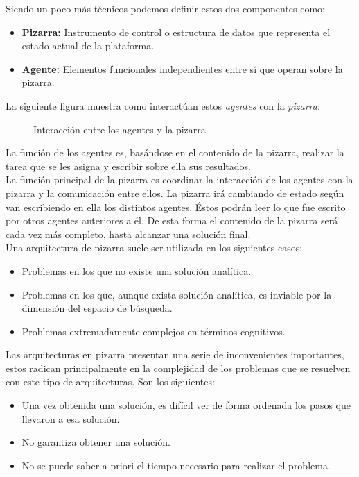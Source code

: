 Siendo un poco más técnicos podemos definir estos dos componentes como:

\begin{itemize}
	\item \textbf{Pizarra: }Instrumento de control o estructura de datos que representa el estado actual de la plataforma.
	\item \textbf{Agente: }Elementos funcionales independientes entre sí que operan sobre la pizarra.
\end{itemize}

La siguiente figura muestra como interactúan estos \emph{agentes} con la \emph{pizarra}:

\begin{figure}[!h]
\centering
{}
\caption{Interacción entre los agentes y la pizarra}
\end{figure}
 
La función de los agentes es, basándose en el contenido de la pizarra, realizar la tarea que se les asigna y escribir sobre ella sus resultados.\\

La función principal de la pizarra es coordinar la interacción de los agentes con la pizarra y la comunicación entre ellos. La pizarra irá cambiando de estado según van escribiendo en ella los distintos agentes. Éstos podrán leer lo que fue escrito por otros agentes anteriores a él. De esta forma el contenido de la pizarra será cada vez más completo, hasta alcanzar una solución final.\\
 
Una arquitectura de pizarra suele ser utilizada en los siguientes casos:

\begin{itemize}
	\item Problemas en los que no existe una solución analítica.
	\item Problemas en los que, aunque exista solución analítica, es inviable por la dimensión del espacio de búsqueda.
	\item Problemas extremadamente complejos en términos cognitivos.
\end{itemize}

Las arquitecturas en pizarra presentan una serie de inconvenientes importantes, estos radican principalmente en la complejidad de los problemas que se resuelven con este tipo de arquitecturas. Son los siguientes:

\begin{itemize}
	\item Una vez obtenida una solución, es difícil ver de forma ordenada los pasos que llevaron a esa solución.
	\item No garantiza obtener una solución.
	\item No se puede saber a priori el tiempo necesario para realizar el problema.
\end{itemize}

